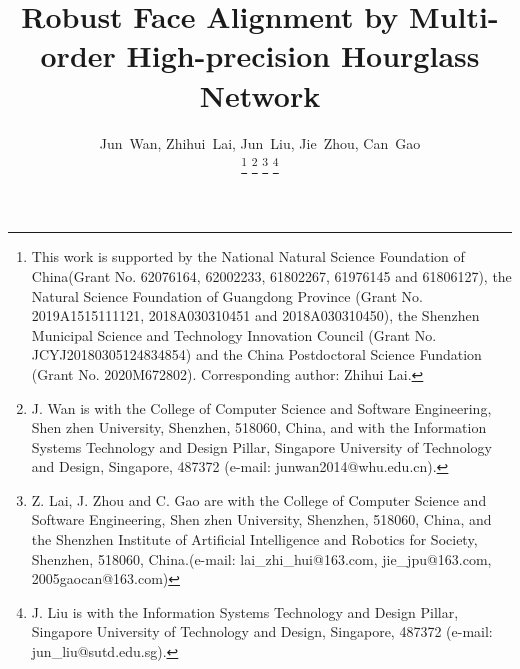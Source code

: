 \documentclass[journal]{IEEEtran}
\begin{document}
\title{Robust Face Alignment by Multi-order High-precision Hourglass Network}

\author{Jun~Wan, Zhihui~Lai, Jun~Liu, Jie~Zhou, Can~Gao
	


	\thanks{This work is supported by the National Natural Science Foundation of China(Grant No.  62076164, 62002233, 61802267, 61976145 and 61806127), the Natural Science Foundation of Guangdong Province (Grant No. 2019A1515111121, 2018A030310451 and 2018A030310450), the Shenzhen Municipal Science and Technology Innovation Council (Grant No. JCYJ20180305124834854) and the China Postdoctoral Science Fundation (Grant No. 2020M672802). Corresponding author: Zhihui Lai.}
	\thanks{J. Wan is with the College of Computer Science and Software Engineering, Shen zhen University, Shenzhen, 518060, China, and with the Information Systems Technology and Design Pillar, Singapore University of Technology and Design, Singapore, 487372 (e-mail: junwan2014@whu.edu.cn).}
	\thanks{Z. Lai, J. Zhou and C. Gao are with the College of Computer Science and Software Engineering, Shen zhen University, Shenzhen, 518060, China, and the Shenzhen Institute of Artificial Intelligence and Robotics for Society, Shenzhen, 518060, China.(e-mail: lai\_zhi\_hui@163.com, jie\_jpu@163.com, 2005gaocan@163.com)}	
	\thanks{J. Liu is with the Information Systems Technology and Design
		Pillar, Singapore University of Technology and Design, Singapore, 487372 (e-mail: jun\_liu@sutd.edu.sg).}
}

\end{document}

